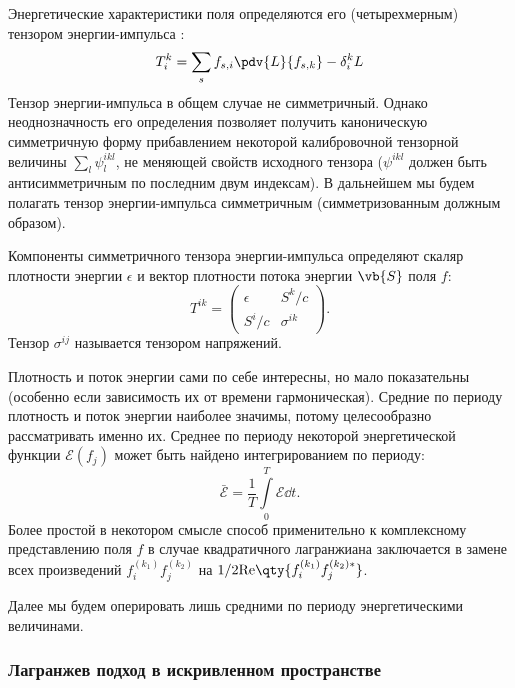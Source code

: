 \documentclass[\docroot/reports/draft/report.tex]{subfiles}
\begin{document}
    Энергетические характеристики поля определяются его (четырехмерным) тензором энергии-импульса \cite{landau_v1,landau_v2}:
    \begin{equation*}
        T_i^k = \sum_s f_{s,i} \pdv{L}{f_{s,k}} - \delta_i^k L
    \end{equation*}
    Тензор энергии-импульса в общем случае не симметричный. Однако неоднозначность его определения позволяет получить каноническую симметричную форму прибавлением некоторой калибровочной тензорной величины $\sum\limits_l \psi^{ikl}_l$, не меняющей свойств исходного тензора ($\psi^{ikl}$ должен быть антисимметричным по последним двум индексам). В дальнейшем мы будем полагать тензор энергии-импульса симметричным (симметризованным должным образом).

    Компоненты симметричного тензора энергии-импульса определяют скаляр плотности энергии $\epsilon$ и вектор плотности потока энергии $\vb{S}$ поля $f$:
    \begin{equation*}
        T^{ik} = \begin{pmatrix}
            \epsilon & S^k / c \\
            S^i / c  & \sigma^{ik}
        \end{pmatrix} .
    \end{equation*}
    Тензор $\sigma^{ij}$ называется тензором напряжений.

    Плотность и поток энергии сами по себе интересны, но мало показательны (особенно если зависимость их от времени гармоническая). Средние по периоду плотность и поток энергии наиболее значимы, потому целесообразно рассматривать именно их. Среднее по периоду некоторой энергетической функции $\mathscr{E}(f_j)$ может быть найдено интегрированием по периоду:
    \begin{equation*}
        \bar{\mathscr{E}} = \frac{1}{T} \int\limits_0^T \mathscr{E} \dd{t} .
    \end{equation*}
    Более простой в некотором смысле способ применительно к комплексному представлению поля $f$ в случае квадратичного лагранжиана заключается в замене всех произведений $f^{(k_1)}_i f^{(k_2)}_j$ на $1/2 \mathrm{Re}\qty{f^{(k_1)}_i f^{(k_2)*}_j}$.

    Далее мы будем оперировать лишь средними по периоду энергетическими величинами.

\subsubsection{Лагранжев подход в искривленном пространстве}
\end{document}
